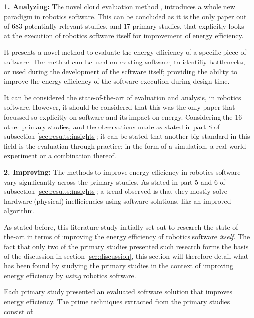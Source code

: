 \noindent\textbf{1. Analyzing:}
The novel cloud evaluation method \cite{hou2017novel_cloud_evaluation_model}, introduces a whole new paradigm in robotics software.
This can be concluded as it is the only paper out of 683 potentially relevant studies, and 17 primary studies, 
that explicitly looks at the execution of robotics software itself for improvement of energy efficiency.

It presents a novel method to evaluate the energy efficiency of a specific piece of software.
The method can be used on existing software, to identifiy bottlenecks, or used during the development of the software itself;
providing the ability to improve the energy efficiency of the software execution during design time.

It can be considered the state-of-the-art of evaluation and analysis, in robotics software.
However, it should be considered that this was the only paper that focussed so explicitly on software and its impact on energy.
Considering the 16 other primary studies, and the observations made as stated in part 8 of subsection \ref{sec:results:insights}; 
it can be stated that another big standard in this field is the evaluation through practice; 
in the form of a simulation, a real-world experiment or a combination thereof.

\vspace{5mm}

\noindent\textbf{2. Improving:}
The methods to improve energy efficiency in robotics software vary significantly across the primary studies. 
As stated in part 5 and 6 of subsection \ref{sec:results:insights}; a trend observed is that they mostly solve hardware (physical) 
inefficiencies using software solutions, like an improved algorithm.

\vspace{2mm}

As stated before, this literature study initially set out to research the state-of-the-art in terms of improving the
energy efficiency of robotics software \textit{itself}.
The fact that only two of the primary studies presented such research forms the basis of the discussion in section \ref{sec:discussion}, 
this section will therefore detail what has been found by studying the primary studies in the context of improving energy efficiency 
by \textit{using} robotics software.

\vspace{2mm}

Each primary study presented an evaluated software solution that improves energy efficiency.
The prime techniques extracted from the primary studies consist of:

